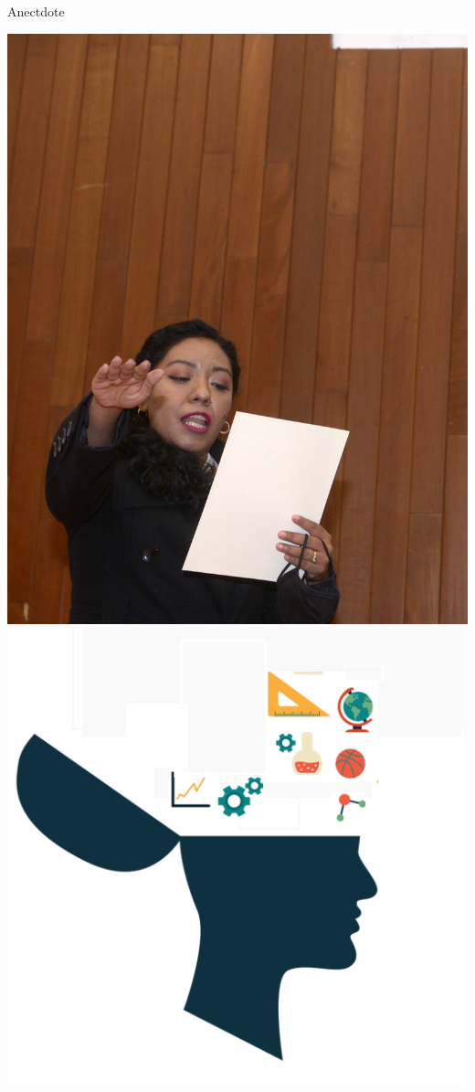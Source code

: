 \documentclass{beamer}
\begin{document}
\begin{frame}
 {Anectdote}

\pause
\begin{center}
 \includegraphics[width=0.45\linewidth]{images/juramento.png}
 \qquad \pause
 \includegraphics[width=0.45\linewidth]{images/open1.png}
\end{center}

\end{frame}
\end{document}
